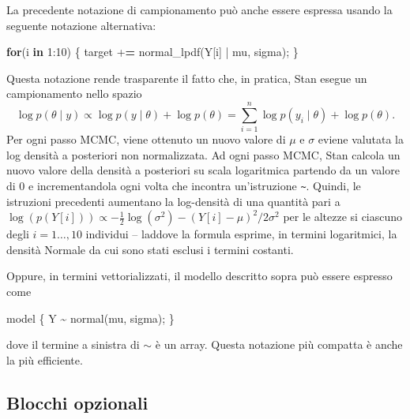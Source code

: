 \documentclass[
  10pt,
  italian,
  a4paper,
  extrafontsizes,onecolumn,openright
  ]{memoir}
\newenvironment{Shaded}{\begin{snugshade}}{\end{snugshade}}
\newcommand{\ControlFlowTok}[1]{\textcolor[rgb]{0.13,0.29,0.53}{\textbf{#1}}}
\newcommand{\DecValTok}[1]{\textcolor[rgb]{0.00,0.00,0.81}{#1}}
\newcommand{\ErrorTok}[1]{\textcolor[rgb]{0.64,0.00,0.00}{\textbf{#1}}}
\newcommand{\FunctionTok}[1]{\textcolor[rgb]{0.00,0.00,0.00}{#1}}
\newcommand{\NormalTok}[1]{#1}
\newcommand{\SpecialCharTok}[1]{\textcolor[rgb]{0.00,0.00,0.00}{#1}}
\begin{document}
La precedente notazione di campionamento può anche essere espressa usando la seguente notazione alternativa:

\begin{Shaded}
\begin{Highlighting}[]
  \ControlFlowTok{for}\NormalTok{(i }\ControlFlowTok{in} \DecValTok{1}\SpecialCharTok{:}\DecValTok{10}\NormalTok{) \{}
\NormalTok{    target }\SpecialCharTok{+}\ErrorTok{=} \FunctionTok{normal\_lpdf}\NormalTok{(Y[i] }\SpecialCharTok{|}\NormalTok{ mu, sigma);}
\NormalTok{  \}}
\end{Highlighting}
\end{Shaded}

\noindent
Questa notazione rende trasparente il fatto che, in pratica, Stan esegue un campionamento nello spazio
\[
\log p(\theta \mid y) \propto \log p(y \mid \theta) + \log p(\theta) = \sum_{i=1}^n \log p(y_i \mid \theta) + \log p(\theta).
\]
Per ogni passo MCMC, viene ottenuto un nuovo valore di \(\mu\) e \(\sigma\) eviene valutata la log densità a posteriori non normalizzata. Ad ogni passo MCMC, Stan calcola un nuovo valore della densità a posteriori su scala logaritmica partendo da un valore di 0 e incrementandola ogni volta che incontra un'istruzione \texttt{\textasciitilde{}}. Quindi, le istruzioni precedenti aumentano la log-densità di una quantità pari a \(\log (p(Y[i])) \propto -\frac{1}{2} \log(\sigma^2) - (Y[i]-\mu)^2 / 2\sigma^2\) per le altezze si ciascuno degli \(i=1 \dots, 10\) individui -- laddove la formula esprime, in termini logaritmici, la densità Normale da cui sono stati esclusi i termini costanti.

Oppure, in termini vettorializzati, il modello descritto sopra può essere espresso come

\begin{Shaded}
\begin{Highlighting}[]
\NormalTok{model \{}
\NormalTok{  Y }\SpecialCharTok{\textasciitilde{}} \FunctionTok{normal}\NormalTok{(mu, sigma);}
\NormalTok{\}}
\end{Highlighting}
\end{Shaded}

\noindent
dove il termine a sinistra di \(\sim\) è un array. Questa notazione più compatta è anche la più efficiente.

\hypertarget{blocchi-opzionali}{%
\subsection{Blocchi opzionali}\label{blocchi-opzionali}}
\end{document}
